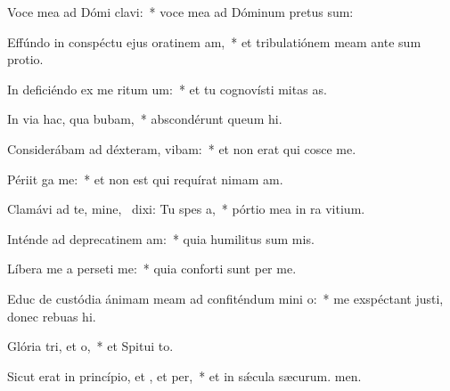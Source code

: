 \item Voce mea ad Dómi clavi:~* voce mea ad Dóminum pretus sum:
\item Effúndo in conspéctu ejus oratinem am,~* et tribulatiónem meam ante sum protio.
\item In deficiéndo ex me ritum um:~* et tu cognovísti mitas as.
\item In via hac, qua bubam,~* abscondérunt queum hi.
\item Considerábam ad déxteram,  vibam:~* et non erat qui cosce me.
\item Périit ga  me:~* et non est qui requírat nimam am.
\item Clamávi ad te, mine,~\pscross{} dixi: Tu  spes a,~* pórtio mea in ra vitium.
\item Inténde ad deprecatinem am:~* quia humilitus sum mis.
\item Líbera me a perseti me:~* quia conforti sunt per me.
\item Educ de custódia ánimam meam ad confiténdum mini o:~* me exspéctant justi, donec rebuas hi.
\item Glória tri, et o,~* et Spitui to.
\item Sicut erat in princípio, et , et per,~* et in sǽcula sæcurum. men.
